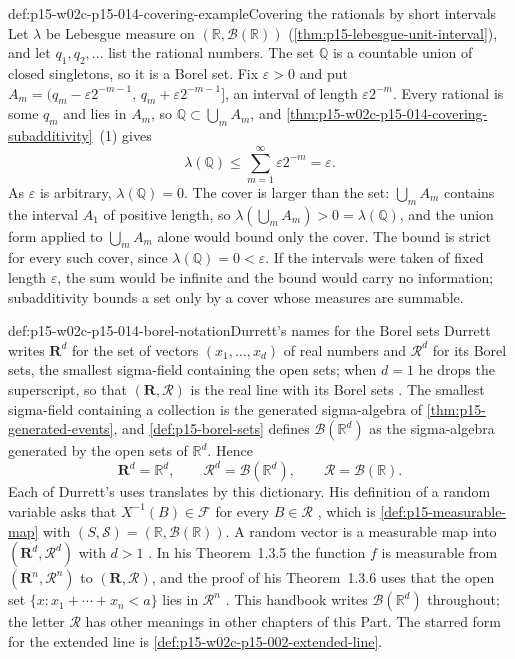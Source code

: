 \begin{hbexample}{def:p15-w02c-p15-014-covering-example}{Covering the rationals by short intervals}
Let \(\lambda\) be Lebesgue measure on \((\mathbb R,\mathcal B(\mathbb R))\)
(\cref{thm:p15-lebesgue-unit-interval}), and let
\(q_1,q_2,\ldots\) list the rational numbers. The set \(\mathbb Q\) is a
countable union of closed singletons, so it is a Borel set. Fix
\(\varepsilon>0\) and put
\(A_m=(q_m-\varepsilon2^{-m-1},\,q_m+\varepsilon2^{-m-1}]\), an interval
of length \(\varepsilon2^{-m}\). Every rational is some \(q_m\) and lies
in \(A_m\), so \(\mathbb Q\subset\bigcup_mA_m\), and
\cref{thm:p15-w02c-p15-014-covering-subadditivity}~(1) gives
\[
 \lambda(\mathbb Q)\leq\sum_{m=1}^\infty\varepsilon2^{-m}=\varepsilon .
\]
As \(\varepsilon\) is arbitrary, \(\lambda(\mathbb Q)=0\). The cover is
larger than the set: \(\bigcup_mA_m\) contains the interval \(A_1\) of
positive length, so \(\lambda(\bigcup_mA_m)>0=\lambda(\mathbb Q)\), and the
union form applied to \(\bigcup_mA_m\) alone would bound only the
cover. The bound is strict for every such cover, since
\(\lambda(\mathbb Q)=0<\varepsilon\). If the intervals were taken of fixed
length \(\varepsilon\), the sum would be infinite and the bound would
carry no information; subadditivity bounds a set only by a cover whose
measures are summable.
\end{hbexample}

\begin{hbconvention}{def:p15-w02c-p15-014-borel-notation}{Durrett's names for the Borel sets}
Durrett writes \(\mathbf R^d\) for the set of vectors
\((x_1,\ldots,x_d)\) of real numbers and \(\mathcal R^d\) for its
Borel sets, the smallest sigma-field containing the open sets; when
\(d=1\) he drops the superscript, so that \((\mathbf R,\mathcal R)\) is
the real line with its Borel sets \cite[sec.~1.1, p.~3]{DurrettPTEAuthor2019}.
The smallest sigma-field containing a collection is the generated
sigma-algebra of \cref{thm:p15-generated-events}, and
\cref{def:p15-borel-sets} defines \(\mathcal B(\mathbb R^d)\) as the
sigma-algebra generated by the open sets of \(\mathbb R^d\). Hence
\[
 \mathbf R^d=\mathbb R^d,\qquad
 \mathcal R^d=\mathcal B(\mathbb R^d),\qquad
 \mathcal R=\mathcal B(\mathbb R).
\]
Each of Durrett's uses translates by this dictionary. His definition of
a random variable asks that \(X^{-1}(B)\in\mathcal F\) for every
\(B\in\mathcal R\) \cite[sec.~1.2, p.~10]{DurrettPTEAuthor2019}, which is
\cref{def:p15-measurable-map} with
\((S,\mathcal S)=(\mathbb R,\mathcal B(\mathbb R))\). A random vector is a
measurable map into \((\mathbf R^d,\mathcal R^d)\) with \(d>1\)
\cite[sec.~1.3, p.~15]{DurrettPTEAuthor2019}. In his Theorem~1.3.5 the
function \(f\) is measurable from \((\mathbf R^n,\mathcal R^n)\) to
\((\mathbf R,\mathcal R)\), and the proof of his Theorem~1.3.6 uses that
the open set \(\{x:x_1+\cdots+x_n<a\}\) lies in \(\mathcal R^n\)
\cite[p.~16]{DurrettPTEAuthor2019}. This handbook writes
\(\mathcal B(\mathbb R^d)\) throughout; the letter \(\mathcal R\) has
other meanings in other chapters of this Part. The starred form for the
extended line is \cref{def:p15-w02c-p15-002-extended-line}.
\end{hbconvention}

